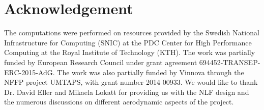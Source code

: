 \section{Acknowledgement} 

The computations were performed on resources provided by the Swedish National Infrastructure for Computing (SNIC) at the PDC Center for High Performance Computing at the Royal Institute of Technology (KTH). The work was partially funded by European Research Council under grant agreement 694452-TRANSEP-ERC-2015-AdG. The work was also partially funded by Vinnova through the NFFP project UMTAPS, with grant number 2014-00933. We would like to thank Dr. David Eller and Mikaela Lokatt for providing us with the NLF design and the numerous discussions on different aerodynamic aspects of the project.



%
%



%
